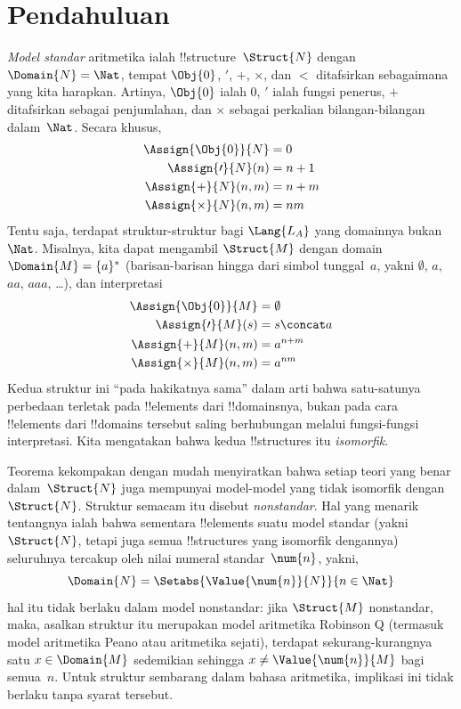 \documentclass[../../../include/open-logic-section]{subfiles}
\begin{document}
\section{Pendahuluan}

\emph{Model standar} aritmetika ialah !!{structure}~$\Struct{N}$ dengan
$\Domain{N} = \Nat$, tempat $\Obj{0}$, $\prime$, $+$, $\times$, dan $<$
ditafsirkan sebagaimana yang kita harapkan. Artinya, $\Obj{0}$ ialah $0$,
$\prime$ ialah fungsi penerus, $+$ ditafsirkan sebagai penjumlahan, dan
$\times$ sebagai perkalian bilangan-bilangan dalam~$\Nat$. Secara khusus,
\begin{align*}
  \Assign{\Obj{0}}{N} & = 0\\
  \Assign{\prime}{N}(n) & = n + 1\\
  \Assign{+}{N}(n, m) & = n + m\\
  \Assign{\times}{N}(n, m) & = nm
\end{align*}
Tentu saja, terdapat struktur-struktur bagi $\Lang{L_A}$ yang domainnya
bukan~$\Nat$. Misalnya, kita dapat mengambil $\Struct{M}$ dengan domain
$\Domain{M} = \{a\}^*$ (barisan-barisan hingga dari simbol tunggal~$a$,
yakni $\emptyset$, $a$, $aa$, $aaa$, \dots), dan interpretasi
\begin{align*}
  \Assign{\Obj{0}}{M} & = \emptyset\\
  \Assign{\prime}{M}(s) & = s \concat a\\
  \Assign{+}{M}(n, m) & = a^{n + m}\\
  \Assign{\times}{M}(n, m) & = a^{nm}
\end{align*}
Kedua struktur ini ``pada hakikatnya sama'' dalam arti bahwa satu-satunya
perbedaan terletak pada !!{element}s dari !!{domain}snya, bukan pada cara
!!{element}s dari !!{domain}s tersebut saling berhubungan melalui fungsi-fungsi
interpretasi. Kita mengatakan bahwa kedua !!{structure}s itu
\emph{isomorfik}.

Teorema kekompakan dengan mudah menyiratkan bahwa setiap teori yang benar
dalam~$\Struct{N}$ juga mempunyai model-model yang tidak isomorfik dengan
$\Struct{N}$. Struktur semacam itu disebut \emph{nonstandar}. Hal yang menarik
tentangnya ialah bahwa sementara !!{element}s suatu model standar (yakni
$\Struct{N}$, tetapi juga semua !!{structure}s yang isomorfik dengannya)
seluruhnya tercakup oleh nilai numeral standar~$\num{n}$, yakni,
\[
\Domain{N} = \Setabs{\Value{\num{n}}{N}}{n \in \Nat}
\]
hal itu tidak berlaku dalam model nonstandar: jika $\Struct{M}$ nonstandar,
maka, asalkan struktur itu merupakan model aritmetika Robinson Q (termasuk
model aritmetika Peano atau aritmetika sejati), terdapat sekurang-kurangnya
satu $x \in \Domain{M}$ sedemikian sehingga $x \neq
\Value{\num{n}}{M}$ bagi semua~$n$. Untuk struktur sembarang dalam bahasa
aritmetika, implikasi ini tidak berlaku tanpa syarat tersebut.
\end{document}

